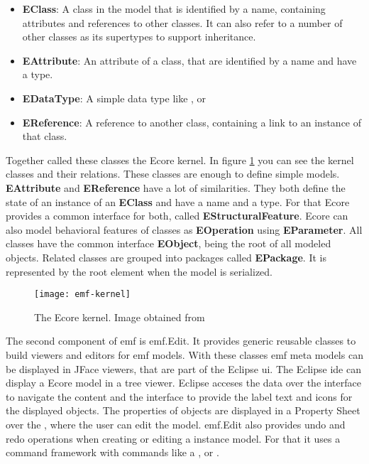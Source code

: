     \begin{itemize}
      \item \textbf{EClass}: A class in the model that is identified by a name, containing attributes and references to other classes. It can also refer to a number of other classes as its supertypes to support inheritance.\cite{emf}
      \item \textbf{EAttribute}: An attribute of a class, that are identified by a name and have a type.\cite{emf}
      \item \textbf{EDataType}: A simple data type like ,  or \cite{emf}
      \item \textbf{EReference}: A reference to another class, containing a link to an instance of that class.\cite{emf}
    \end{itemize}


    Together \citeauthor{emf} called these classes the Ecore kernel. In figure \ref{fig:emf-kernel} you can see the kernel classes and their relations. These classes are enough to define simple models. \textbf{EAttribute} and \textbf{EReference} have a lot of similarities. They both define the state of an instance of an \textbf{EClass} and have a name and a type. For that Ecore provides a common interface for both, called \textbf{EStructuralFeature}. Ecore can also model behavioral features of classes as \textbf{EOperation} using \textbf{EParameter}. All classes have the common interface \textbf{EObject}, being the root of all modeled objects. Related classes are grouped into packages called \textbf{EPackage}. It is represented by the root element when the model is serialized. \cite{emf}

    \begin{figure}[h]
      \centering
      \texttt{[image: emf-kernel]}
      \caption{The Ecore kernel. Image obtained from \cite{emf}}
      \label{fig:emf-kernel}
    \end{figure}

    The second component of \ac{emf} is \ac{emf}.Edit. It provides generic reusable classes to build viewers and editors for \ac{emf} models. With these classes \ac{emf} meta models can be displayed in JFace viewers, that are part of the Eclipse \acs{ui}. \cite{eclipse_emf} The Eclipse \ac{ide} can display a Ecore model in a tree viewer. Eclipse acceses the data over the  interface to navigate the content and the  interface to provide the label text and icons for the displayed objects.  The properties of objects are displayed in a Property Sheet over the , where the user can edit the model.  \ac{emf}.Edit also provides undo and redo operations when creating or editing a instance model. For that it uses a command framework with commands like a ,  or . \cite{emf}

